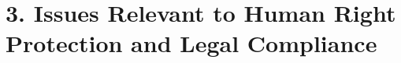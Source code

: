 \documentclass[10pt,a4j,dvipdfmx]{jarticle} 					%
\newcommand{\研究課題名}{象の卵}
\newcommand{\研究機関名}{逢坂大学}
\newcommand{\研究代表者氏名}{湯川秀樹}
\newcommand{\研究期間の最終元号年度}{7}  %
\begin{document}
\section{3. Issues Relevant to Human Right Protection and Legal Compliance}

%



\end{document}

